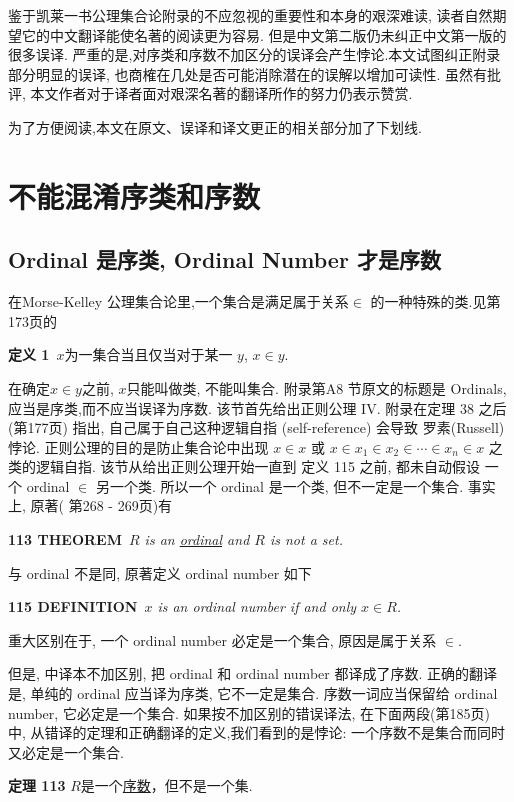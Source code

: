\documentclass[zihao=-4,a4paper]{ctexart}
\begin{document}
鉴于凯莱一书公理集合论附录的不应忽视的重要性和本身的艰深难读, 读者自然期望它的中文翻译能使名著的阅读更为容易. 但是中文第二版仍未纠正中文第一版的很多误译. 严重的是,对序类和序数不加区分的误译会产生悖论.本文试图纠正附录部分明显的误译, 也商榷在几处是否可能消除潜在的误解以增加可读性. 虽然有批评, 本文作者对于译者面对艰深名著的翻译所作的努力仍表示赞赏.

为了方便阅读,本文在原文、误译和译文更正的相关部分加了下划线.
	
\section{不能混淆序类和序数}
\subsection{Ordinal 是序类, Ordinal Number 才是序数}
在Morse-Kelley 公理集合论里,一个集合是满足属于关系$\in$ 的一种特殊的类.见\cite{jkelley2010zh}第173页的

{\bf 定义 1}\, {\kaishu $x$为一集合当且仅当对于某一 $y$, $x\in y$. }

在确定$x\in y$之前, $x$只能叫做类, 不能叫集合.
附录第A8 节原文的标题是 Ordinals,应当是序类,而不应当误译为序数. 该节首先给出正则公理 IV. 附录在定理 38 之后(\cite{jkelley2010zh}第177页) 指出, 自己属于自己这种逻辑自指 (self-reference) 会导致 
罗素(Russell) 悖论. 正则公理的目的是防止集合论中出现 $x\in x$ 或 
$x\in x_1 \in x_2 \in \cdots \in x_n \in x$
之类的逻辑自指. 该节从给出正则公理开始一直到 定义 115 之前, 都未自动假设 一个 ordinal $\in$ 另一个类. 所以一个 ordinal 是一个类, 但不一定是一个集合.
事实上, 原著(\cite{jkelley1975} 第268 - 269页)有

{\bf 113 THEOREM}\,
{\sl 
	$R$ is an \underline{ordinal} and $R$ is not a set.
}

\noindent 与 ordinal 不是同, 原著定义 ordinal number 如下

{\bf 115 DEFINITION}\,
{\sl 
	$x$ is an ordinal number if and only $x \in R$.
}

\noindent 重大区别在于, 一个 ordinal number 必定是一个集合, 原因是属于关系 $\in$.

但是, 中译本不加区别, 把 ordinal  和 ordinal number 都译成了序数. 正确的翻译是, 单纯的 ordinal 应当译为{\kaishu 序类}, 它不一定是集合. {\kaishu 序数}一词应当保留给 ordinal number, 它必定是一个集合. 
如果按不加区别的错误译法, 在下面两段(\cite{jkelley2010zh}第185页) 中, 从错译的定理和正确翻译的定义,我们看到的是悖论: 一个序数不是集合而同时又必定是一个集合.

{\bf 定理 113}
{\kaishu
$R$是一个\underline{序数}，但不是一个集.
}
\end{document}

